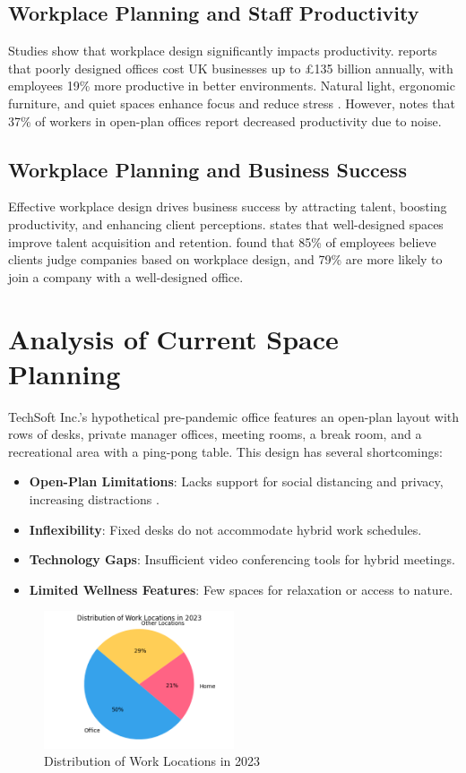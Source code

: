 \documentclass[12pt]{article}
\begin{document}
\subsection{Workplace Planning and Staff Productivity}
Studies show that workplace design significantly impacts productivity. \citet{sketchstudios2023} reports that poorly designed offices cost UK businesses up to £135 billion annually, with employees 19\% more productive in better environments. Natural light, ergonomic furniture, and quiet spaces enhance focus and reduce stress \citep{haiken2023}. However, \citet{ciphr2023} notes that 37\% of workers in open-plan offices report decreased productivity due to noise.

\subsection{Workplace Planning and Business Success}
Effective workplace design drives business success by attracting talent, boosting productivity, and enhancing client perceptions. \citet{moneypenny2025} states that well-designed spaces improve talent acquisition and retention. \citet{officespace2019} found that 85\% of employees believe clients judge companies based on workplace design, and 79\% are more likely to join a company with a well-designed office.

\section{Analysis of Current Space Planning}
TechSoft Inc.'s hypothetical pre-pandemic office features an open-plan layout with rows of desks, private manager offices, meeting rooms, a break room, and a recreational area with a ping-pong table. This design has several shortcomings:
\begin{itemize}
    \item \textbf{Open-Plan Limitations}: Lacks support for social distancing and privacy, increasing distractions \citep{ciphr2023}.
    \item \textbf{Inflexibility}: Fixed desks do not accommodate hybrid work schedules.
    \item \textbf{Technology Gaps}: Insufficient video conferencing tools for hybrid meetings.
    \item \textbf{Limited Wellness Features}: Few spaces for relaxation or access to nature.
\end{itemize}

\begin{figure}[h]
    \centering
    \includegraphics[width=0.5\textwidth]{work_locations.png}
    \caption{Distribution of Work Locations in 2023 \citep{gensler2024}}
\end{figure}
\end{document}
